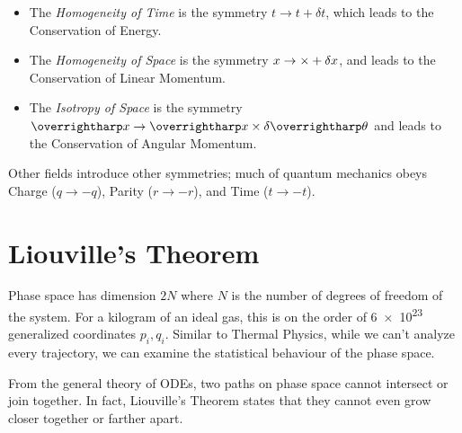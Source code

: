 \begin{itemize}
	
	\item The \emph{Homogeneity of Time} is the symmetry \(t\to t+\delta t\), which leads to the Conservation of Energy.

	\item The \emph{Homogeneity of Space} is the symmetry \(x\rightarrow\times+\delta x\), and leads to the Conservation of Linear Momentum.

	\item The \emph{Isotropy of Space} is the symmetry \(\vv x \to \vv x \times \delta\vv \theta\) and leads to the Conservation of Angular Momentum.

\end{itemize}

Other fields introduce other symmetries; much of quantum mechanics obeys Charge (\(q\to-q\)), Parity (\(r\to -r\)), and Time (\(t\to -t\)).

\section{Liouville's Theorem}
Phase space has dimension \(2N\) where \(N\) is the number of degrees of freedom of the system. For a kilogram of an ideal gas, this is on the order of \SI{6e23}{} generalized coordinates \(p_i, q_i\). Similar to Thermal Physics, while we can't analyze every trajectory, we can examine the statistical behaviour of the phase space.

From the general theory of ODEs, two paths on phase space cannot intersect or join together. In fact, Liouville's Theorem states that they cannot even grow closer together or farther apart.


